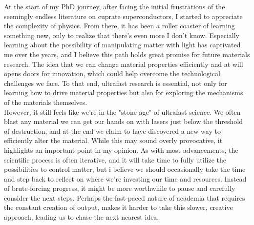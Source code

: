At the start of my PhD journey, after facing the initial frustrations of the seemingly endless literature on cuprate superconductors, I started to appreciate the complexity of physics.
From there, it has been a roller coaster of learning something new, only to realize that there’s even more I don’t know.
Especially learning about the possibility of manipulating matter with light has captivated me over the years, and I believe this path holds great promise for future materials research.
The idea that we can change material properties efficiently and at will opens doors for innovation, which could help overcome the technological challenges we face.
To that end, ultrafast research is essential, not only for learning how to drive material properties but also for exploring the mechanisms of the materials themselves.\\
However, it still feels like we're in the "stone age" of ultrafast science.
We often blast any material we can get our hands on with lasers just below the threshold of destruction, and at the end we claim to have discovered a new way to efficiently alter the material.
While this may sound overly provocative, it highlights an important point in my opinion.
As with most advancements, the scientific process is often iterative, and it will take time to fully utilize the possibilities to control matter, but i believe we should occasionally take the time and step back to reflect on where we’re investing our time and resources.
Instead of brute-forcing progress, it might be more worthwhile to pause and carefully consider the next steps.
Perhaps the fast-paced nature of academia that requires the constant creation of output, makes it harder to take this slower, creative approach, leading us to chase the next nearest idea.\hfill\break

